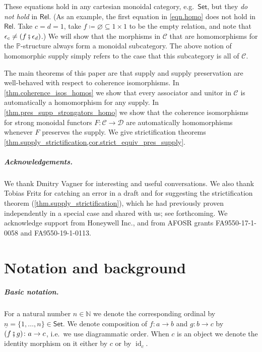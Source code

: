 \documentclass[11pt, oneside, article]{memoir}
\theoremstyle{plain}
\theoremstyle{definition}
\theoremstyle{remark}
\newcommand{\ord}[1]{\underline{#1}}%
\newcommand{\cat}[1]{\mathcal{#1}}%
\newcommand{\Cat}[1]{{\mathsf{#1}}}%
\DeclareMathOperator{\id}{id}
\newcommand{\smset}{\Cat{Set}}
\newcommand{\nn}{\mathbb{N}}
\newcommand{\pp}{\mathbb{P}}
\newcommand{\rel}{\Cat{Rel}}
\newcommand{\cp}{\mathbin{\fatsemi}}
\renewcommand{\ss}{\subseteq}
\begin{document}
These equations hold in any cartesian monoidal category, e.g.\ $\smset$, but they \emph{do not hold} in $\rel$. (As an example, the first equation in \eqref{eqn.homo} does not hold in $\rel$. Take $c=d=1$, take $f\coloneqq\varnothing\ss 1\times 1$ to be the empty relation, and note that $\epsilon_c \neq (f\cp\epsilon_d)$.) We will show that the morphisms in $\cat{C}$ that are homomorphisms for the $\pp$-structure always form a monoidal subcategory. The above notion of homomorphic supply simply refers to the case that this subcategory is all of $\cat{C}$.

The main theorems of this paper are that supply and supply preservation are well-behaved with respect to coherence isomorphisms. In \cref{thm.coherence_isos_homos} we show that every associator and unitor in $\cat{C}$ is automatically a homomorphism for any supply. In \cref{thm.pres_supp_strongators_homo} we show that the coherence isomorphisms for strong monoidal functors $F\colon\cat{C}\to\cat{D}$ are automatically homomorphisms whenever $F$ preserves the supply. We give strictification theorems \cref{thm.supply_strictification,cor.strict_equiv_pres_supply}.
 
\paragraph{Acknowledgements.}
We thank Dmitry Vagner for interesting and useful conversations. We also thank Tobias Fritz for catching an error in a draft and for suggesting the strictification theorem (\cref{thm.supply_strictification}), which he had previously proven independently in a special case and shared with us; see \cite{fritz2019synthetic} forthcoming. We acknowledge support from Honeywell Inc., and from AFOSR grants FA9550-17-1-0058 and FA9550-19-1-0113.


\chapter{Notation and background}

\paragraph{Basic notation.}
For a natural number $n\in\nn$ we denote the corresponding ordinal by $\ord{n}=\{1,\ldots,n\}\in\smset$. %
We denote composition of $f\colon a\to b$ and $g\colon b\to c$ by $(f\cp g)\colon a\to c$, i.e.\ we use diagrammatic order. When $c$ is an object we denote the identity morphism on it either by $c$ or by $\id_c$.
\end{document}
